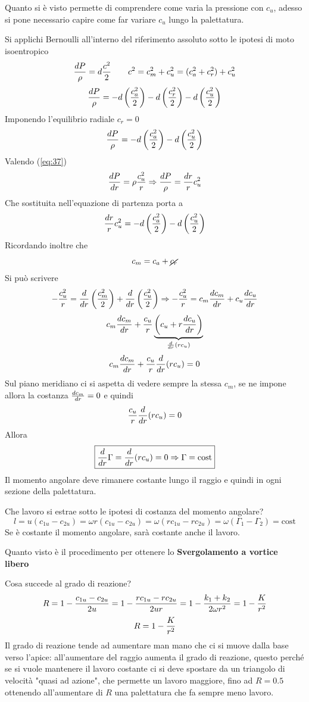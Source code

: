 \documentclass[a4paper, 15pt]{article}
\begin{document}
\begin{adjustwidth}{2in}{}
	Quanto si è visto permette di comprendere come varia la pressione con $c_u$, adesso si pone necessario capire come far variare $c_u$ lungo la palettatura.\newline  
	
	Si applichi Bernoulli all'interno del riferimento assoluto sotto le ipotesi di moto isoentropico
	\[{dP\over\rho} = d{c^2\over2} \qquad c^2 = c_m^2+c_u^2 = (c_a^2+c_r^2)+c_u^2\]
	\[{dP\over\rho} = -d\left(c_a^2\over2\right) - d\left(c_r^2\over2\right) - d\left(c_u^2\over2\right)\]
	Imponendo l'equilibrio radiale $c_r=0$
	\[{dP\over\rho} = -d\left(c_a^2\over2\right)  - d\left(c_u^2\over2\right)\]
	Valendo (\ref{eq:37})  
	\[{dP\over dr} = \rho{c_u^2\over r}\Rightarrow {dP\over\rho} = {dr\over r}c_u^2\]
	Che sostituita nell'equazione di partenza porta a
	\[{dr\over r}c_u^2 = -d\left(c_a^2\over2\right)  - d\left(c_u^2\over2\right)\]
	Ricordando inoltre che 
	\[c_m = c_a+\cancel{c_r}\]
	Si può scrivere
	\[-{c_u^2\over r} = {d\over dr}\left(c_m^2\over2\right)  + {d\over dr}\left(c_u^2\over2\right) \Rightarrow -{c_u^2\over r} = c_m {dc_m\over dr} + c_u {dc_u\over dr} \]
	\[c_m {dc_m\over dr} + {c_u\over r}\underbrace{\left(c_u+r{dc_u\over dr}\right)}_{{d\over dr}(rc_u)}\]
	\[c_m{dc_m\over dr} +{c_u\over r} {d\over dr}(rc_u) = 0 \]
	Sul piano meridiano ci si aspetta di vedere sempre la stessa $c_m$, se ne impone allora la costanza ${dc_m\over dr}=0$ e quindi
	\[{c_u\over r} {d\over dr}(rc_u) = 0\]
	Allora 
	\begin{equation}\label{eq:38}
		\boxed{{d\over dr}\Gamma = {d\over dr}(rc_u) = 0 \Rightarrow\Gamma=\text{cost}}
	\end{equation}
	Il momento angolare deve rimanere costante lungo il raggio e quindi in ogni sezione della palettatura. \newline 
	
	Che lavoro si estrae sotto le ipotesi di costanza del momento angolare? 
	\[l = u(c_{1u}-c_{2u}) = \omega r(c_{1u}-c_{2u}) = \omega(rc_{1u}-rc_{2u}) = \omega(\Gamma_1-\Gamma_2) = \text{cost}\]
	Se è costante il momento angolare, sarà costante anche il lavoro. \newline 
	
	Quanto visto è il procedimento per ottenere lo \textbf{Svergolamento a vortice libero}\newline 
	
	Cosa succede al grado di reazione?
	\[R = 1- \dfrac{c_{1u}-c_{2u}}{2u} = 1- \dfrac{rc_{1u}-rc_{2u}}{2ur} = 1- \dfrac{k_1+k_2}{2\omega r^2} = 1 - {K\over r^2}\]
	\begin{equation} \label{eq:39}
		R = 1- {K\over r^2}
	\end{equation}
	 Il grado di reazione tende ad aumentare man mano che ci si muove dalla base verso l'apice: all'aumentare del raggio aumenta il grado di reazione, questo perché se si vuole mantenere il lavoro costante ci si deve spostare da un triangolo di velocità "quasi ad azione", che permette un lavoro maggiore, fino ad $R=0.5$ ottenendo all'aumentare di $R$ una palettatura che fa sempre meno lavoro.
	 

\end{adjustwidth}
\end{document}
